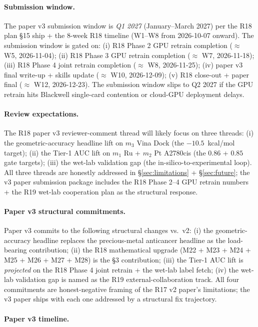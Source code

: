 \paragraph{Submission window.}
The paper v3 submission window is \emph{Q1 2027}
(January--March 2027) per the R18 plan §15 ship + the
$8$-week R18 timeline (W1--W8 from 2026-10-07 onward).
The submission window is gated on: (i) R18 Phase 2 GPU
retrain completion ($\approx$ W5, 2026-11-04); (ii) R18
Phase 3 GPU retrain completion ($\approx$ W7, 2026-11-18);
(iii) R18 Phase 4 joint retrain completion ($\approx$ W8,
2026-11-25); (iv) paper v3 final write-up + skills update
($\approx$ W10, 2026-12-09); (v) R18 close-out + paper
final ($\approx$ W12, 2026-12-23).  The submission window
slips to Q2 2027 if the GPU retrain hits Blackwell single-card
contention or cloud-GPU deployment delays.

\paragraph{Review expectations.}
The R18 paper v3 reviewer-comment thread will likely focus on
three threads: (i) the geometric-accuracy headline lift on
$m_3$ Vina Dock (the $-10.5$~kcal/mol target); (ii) the
Tier-1 AUC lift on $m_1$ Ru + $m_2$ Pt A2780cis (the $0.86$
+ $0.85$ gate targets); (iii) the wet-lab validation gap
(the in-silico-to-experimental loop).  All three threads are
honestly addressed in \S\ref{sec:limitations} +
\S\ref{sec:future}; the v3 paper submission package
includes the R18 Phase 2--4 GPU retrain numbers + the R19
wet-lab cooperation plan as the structural response.

\paragraph{Paper v3 structural commitments.}
Paper v3 commits to the following structural changes vs.\ v2:
(i) the geometric-accuracy headline replaces the
precious-metal anticancer headline as the load-bearing
contribution; (ii) the R18 mathematical upgrade (M22 + M23 +
M24 + M25 + M26 + M27 + M28) is the §3 contribution; (iii)
the Tier-1 AUC lift is \emph{projected} on the R18 Phase 4
joint retrain + the wet-lab label fetch; (iv) the wet-lab
validation gap is named as the R19 external-collaboration
track.  All four commitments are honest-negative framing of
the R17 v2 paper's limitations; the v3 paper ships with
each one addressed by a structural fix trajectory.

\paragraph{Paper v3 timeline.}

